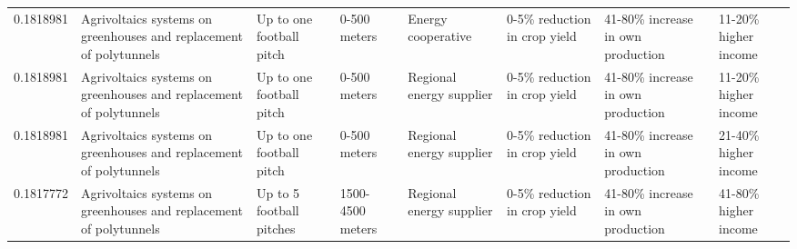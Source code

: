 \begin{table}
\begin{tabular}[t]{rlllllll}
0.1818981 & Agrivoltaics systems on greenhouses
and replacement of polytunnels & Up to one football pitch & 0-500 meters & Energy cooperative & 0-5\% reduction in crop yield & 41-80\% increase in own production & 11-20\% higher income\\
0.1818981 & Agrivoltaics systems on greenhouses
and replacement of polytunnels & Up to one football pitch & 0-500 meters & Regional energy supplier & 0-5\% reduction in crop yield & 41-80\% increase in own production & 11-20\% higher income\\
0.1818981 & Agrivoltaics systems on greenhouses
and replacement of polytunnels & Up to one football pitch & 0-500 meters & Regional energy supplier & 0-5\% reduction in crop yield & 41-80\% increase in own production & 21-40\% higher income\\
0.1817772 & Agrivoltaics systems on greenhouses
and replacement of polytunnels & Up to 5 football pitches & 1500-4500 meters & Regional energy supplier & 0-5\% reduction in crop yield & 41-80\% increase in own production & 41-80\% higher income\\
\bottomrule
\end{tabular}
\end{table}
